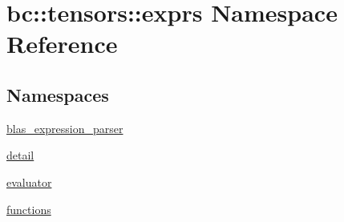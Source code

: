\hypertarget{namespacebc_1_1tensors_1_1exprs}{}\section{bc\+:\+:tensors\+:\+:exprs Namespace Reference}
\label{namespacebc_1_1tensors_1_1exprs}
\subsection*{Namespaces}
\begin{DoxyCompactItemize}
\item 
 \hyperlink{namespacebc_1_1tensors_1_1exprs_1_1blas__expression__parser}{blas\+\_\+expression\+\_\+parser}
\item 
 \hyperlink{namespacebc_1_1tensors_1_1exprs_1_1detail}{detail}
\item 
 \hyperlink{namespacebc_1_1tensors_1_1exprs_1_1evaluator}{evaluator}
\item 
 \hyperlink{namespacebc_1_1tensors_1_1exprs_1_1functions}{functions}
\end{DoxyCompactItemize}
